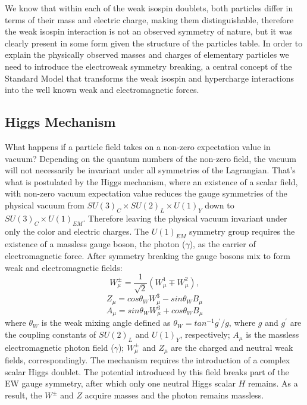 We know that within each of the weak isospin doublets, both particles 
differ in terms of their
mass and electric charge, making them distinguishable,
 therefore the weak isospin interaction is
 not an observed symmetry of nature, but it was clearly present
in some form given the structure of the particles table. 
In order to explain the physically observed masses and charges of elementary
 particles we need to introduce the electroweak symmetry breaking, a central concept
of the Standard Model that transforms the
weak isospin and hypercharge interactions into the well known weak and electromagnetic forces.



\subsection{Higgs Mechanism}

What happens if a particle field takes on a non-zero expectation value in vacuum? Depending on the
quantum numbers of the non-zero field, the vacuum will not necessarily be invariant under
all symmetries of the Lagrangian. That's what is postulated by the Higgs mechanism, where
an existence of a scalar field, with non-zero vacuum expectation value
reduces the gauge symmetries of the physical 
vacuum from $SU(3)_C \times SU(2)_L \times U(1)_Y$
down to $SU(3)_C \times U(1)_{EM}$. Therefore leaving the physical vacuum invariant under
only the color and electric charges. 
The $U(1)_{EM}$ symmetry group requires the existence of a massless
gauge boson, the photon ($\gamma$), as the carrier of electromagnetic force.
After symmetry breaking the gauge bosons mix to form weak and electromagnetic fields:
\begin{equation}
W_{\mu}^{\pm}=\frac{1}{\sqrt{2}}\left( W_{\mu}^1 \mp W_{\mu}^{2}\right),
\end{equation}
\begin{equation}
Z_{\mu}=cos\theta_W W_{\mu}^3-sin\theta_W B_{\mu}
\end{equation}
\begin{equation}
A_{\mu}=sin\theta_W W_{\mu}^3+cos\theta_W B_{\mu}
\end{equation}
where $\theta_W$ is the weak mixing angle defined as $\theta_W=tan^{-1} g^{'}/g$, where $g$ 
and $g^{'}$ are the coupling constants of $SU(2)_L$ and $U(1)_Y$, respectively; $A_{\mu}$ is the 
massless electromagnetic photon field ($\gamma$); $W_{\mu}^{\pm}$ and $Z_{\mu}$ are the charged 
and neutral weak fields, correspondingly. The mechanism requires the introduction of a complex
scalar Higgs doublet. The potential introduced by this field breaks part of the EW gauge symmetry,
after which only one neutral Higgs scalar $H$ remains. As a result, 
the $W^{\pm}$ and $Z$ acquire masses and the photon remains massless.

